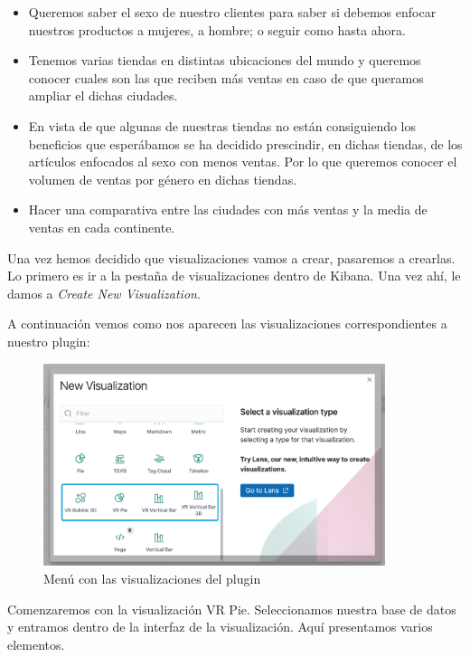 \documentclass[a4paper, 12pt]{book}
\begin{document}
\begin{itemize}
    \item Queremos saber el sexo de nuestro clientes para saber si debemos enfocar nuestros productos a mujeres, a hombre; o seguir como hasta ahora.
    \item Tenemos varias tiendas en distintas ubicaciones del mundo y queremos conocer cuales son las que reciben más ventas en caso de que queramos ampliar el dichas ciudades.
    \item En vista de que algunas de nuestras tiendas no están consiguiendo los beneficios que esperábamos se ha decidido prescindir, en dichas tiendas, de los artículos enfocados al sexo con menos ventas. Por lo que queremos conocer el volumen de ventas por género en dichas tiendas.
    \item Hacer una comparativa entre las ciudades con más ventas y la media de ventas en cada continente.
\end{itemize}

Una vez hemos decidido que visualizaciones vamos a crear, pasaremos a crearlas. Lo primero es ir a la pestaña de visualizaciones dentro de Kibana. Una vez ahí, le damos a \textit{Create New Visualization}.

A continuación vemos como nos aparecen las visualizaciones correspondientes a nuestro plugin:

\begin{figure}[H]
  \centering
  \includegraphics[width=10cm, keepaspectratio]{img/development/visualizaciones-menu-use.png}
  \caption{Menú con las visualizaciones del plugin}
  \label{fig:menuvisualizacionesuse}
\end{figure}

Comenzaremos con la visualización VR Pie. Seleccionamos nuestra base de datos y entramos dentro de la interfaz de la visualización. Aquí presentamos varios elementos.
\end{document}
